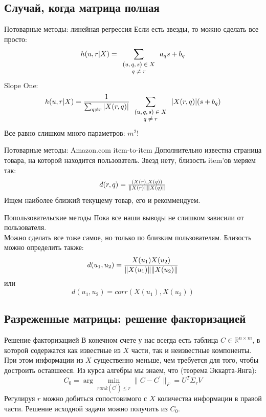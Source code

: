 \documentclass[14pt, fleqn, xcolor={dvipsnames, table}]{beamer}
\begin{document}
\subsection{Случай, когда матрица полная} %

\begin{frame}{Потоварные методы: линейная регрессия}
Если есть звезды, то можно сделать все просто:
$$
h(u, r|X) = \sum_{\footnotesize\begin{array}{c}(u,q,s) \in X \\ q \ne r\end{array}} a_q s + b_q
$$
Slope One:
$$
h(u, r|X) = \frac{1}{\sum_{q \ne r} |X(r,q)|} \sum_{\footnotesize\begin{array}{c}(u,q,s) \in X \\ q \ne r\end{array}} |X(r,q)|(s + b_q)
$$
Все равно слишком много параметров: $m^2$!
\end{frame}

\begin{frame}{Потоварные методы: Amazon.com item-to-item}
Дополнительно известна страница товара, на которой находится пользователь. Звезд нету, близость item'ов меряем так:
$$\begin{array}{l}
d(r,q) = {(X(r),X(q)) \over \|X(r)\| \|X(q)\|}
\end{array}$$
Ищем наиболее близкий текущему товар, его и рекоммендуем.
\end{frame}

\begin{frame}{Попользовательские методы}
Пока все наши выводы не слишком зависили от пользователя. \\
Можно сделать все тоже самое, но только по близким пользователям. Близость можно определить также:
$$
d(u_1, u_2) = {X(u_1) X(u_2) \over \|X(u_1)\| \|X(u_2)\|}
$$
или 
$$
d(u_1, u_2) = corr(X(u_1), X(u_2))
$$
\end{frame}

\subsection{Разреженные матрицы: решение факторизацией} %
\begin{frame}{Решение факторизацией}
\small
В конечном счете у нас всегда есть таблица $C \in \mathbb{R}^{n \times m}$, в которой содержатся как известные из $X$ части, так и неизвестные компоненты. При этом информации из $X$ существенно меньше, чем требуется для того, чтобы достроить оставшееся. Из курса алгебры мы знаем, что (теорема Эккарта-Янга):
$$
C_0 = \arg \min_{rank(C^{'}) \le r} \|C - C^{'}\|_F = U^T \Sigma_r V
$$
Регулируя $r$ можно добиться сопостовимого с $X$ количества информации в правой части. Решение исходной задачи можно получить из $C_0$.
\end{frame}
\end{document}
